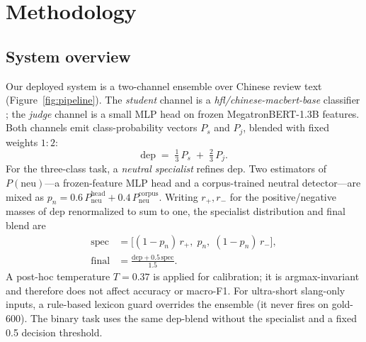 
\section{Methodology}
\label{sec:method}

\subsection{System overview}
\label{sec:method:system}

Our deployed system is a two-channel ensemble over Chinese review text
(Figure~\ref{fig:pipeline}). The \emph{student} channel is a
\emph{hfl/chinese-macbert-base} classifier \citep{cui2020macbert}; the
\emph{judge} channel is a small MLP head on frozen
MegatronBERT-1.3B features. Both channels emit class-probability
vectors $P_s$ and $P_j$, blended with fixed weights $1{:}2$:
\begin{equation}
  \mathrm{dep} \;=\; \tfrac{1}{3}\,P_s \;+\; \tfrac{2}{3}\,P_j .
  \label{eq:dep}
\end{equation}
For the three-class task, a \emph{neutral specialist} refines $\mathrm{dep}$.
Two estimators of $P(\mathrm{neu})$---a frozen-feature MLP head and a
corpus-trained neutral detector---are mixed as
$p_n = 0.6\,P_{\mathrm{neu}}^{\mathrm{head}} +
0.4\,P_{\mathrm{neu}}^{\mathrm{corpus}}$. Writing $r_{+}, r_{-}$ for the
positive/negative masses of $\mathrm{dep}$ renormalized to sum to one, the
specialist distribution and final blend are
\begin{equation}
  \begin{aligned}
    \mathrm{spec} &= \big[(1-p_n)\,r_{+},\; p_n,\; (1-p_n)\,r_{-}\big],\\
    \mathrm{final} &= \frac{\mathrm{dep} + 0.5\,\mathrm{spec}}{1.5}.
  \end{aligned}
  \label{eq:spec}
\end{equation}
A post-hoc temperature $T{=}0.37$ is applied for calibration; it is
argmax-invariant and therefore does not affect accuracy or macro-F1. For
ultra-short slang-only inputs, a rule-based lexicon guard overrides the
ensemble (it never fires on gold-600). The binary task uses the same
dep-blend without the specialist and a fixed 0.5 decision threshold.

